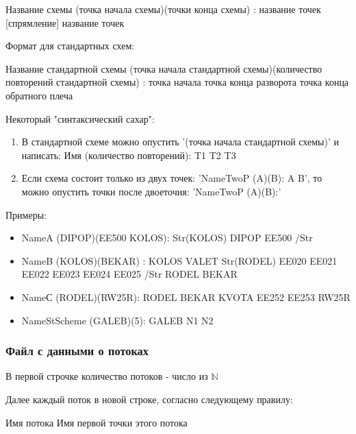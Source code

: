 \documentclass[12pt, a4 paper]{article}
\theoremstyle{plain}
\begin{document}
\bigskip

\begin{center}
Название схемы (точка начала схемы)(точки конца схемы) : название точек [спрямление] название точек
\end{center}

\bigskip

Формат для стандартных схем:

\bigskip

\begin{center}
Название стандартной схемы (точка начала стандартной схемы)(количество повторений стандартной схемы) : точка начала точка конца разворота точка конца обратного плеча
\end{center}

\bigskip

Некоторый "синтаксический сахар":

\begin{enumerate}
	\item В стандартной схеме можно опустить '(точка начала стандартной схемы)' и написать: Имя (количество повторений): T1 T2 T3
	\item Если схема состоит только из двух точек: 'NameTwoP (A)(B): A B', то можно опустить точки после двоеточия: 'NameTwoP (A)(B):'
\end{enumerate}

Примеры:
\begin{itemize}
	\item NameA (DIPOP)(EE500 KOLOS): Str(KOLOS) DIPOP EE500 /Str
	\item NameB (KOLOS)(BEKAR) : KOLOS VALET Str(RODEL) EE020 EE021 EE022 EE023 EE024 EE025 /Str RODEL BEKAR
	\item NameС (RODEL)(RW25R): RODEL BEKAR KVOTA EE252 EE253 RW25R
	\item NameStScheme (GALEB)(5): GALEB N1 N2
\end{itemize}


\subsubsection{Файл с данными о потоках}

В первой строчке количество потоков - число из $\mathbb{N}$

Далее каждый  поток в новой строке, согласно следующему правилу:

\begin{center}
Имя потока  Имя первой точки этого потока
\end{center}
\end{document}
